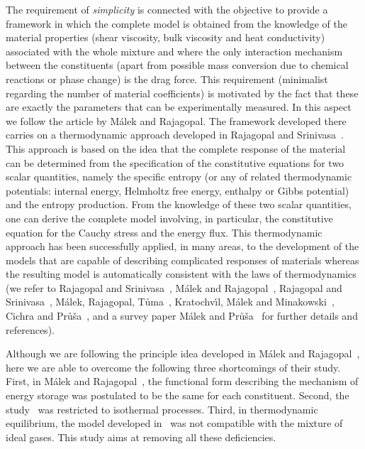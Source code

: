 \documentclass[a4paper]{article}
\begin{document}
The requirement of \textit{simplicity} is connected with the objective to provide a framework in which the complete model is obtained from the knowledge of the material properties (shear viscosity, bulk viscosity and heat conductivity) associated with the whole mixture and where the only interaction mechanism between the constituents (apart from possible mass conversion due to chemical reactions or phase change) is the drag force. This requirement (minimalist regarding the number of material coefficients) is motivated by the fact that these are exactly the parameters that can be experimentally measured. In this aspect we follow the article by M\'{a}lek and Rajagopal\cite{malek-2008}. The framework developed there carries on a thermodynamic approach developed in Rajagopal and Srinivasa~\cite{Rajagopal-Srinivasa-2004}. This approach is based on the idea that the complete response of the material can be determined from the specification of the constitutive equations for two scalar quantities, namely the specific entropy (or any of related thermodynamic potentials: internal energy, Helmholtz free energy, enthalpy or Gibbs potential) and the entropy production. From the knowledge of these two scalar quantities, one can derive the complete model involving, in particular, the constitutive equation for the Cauchy stress and the energy flux. This thermodynamic approach has been successfully applied, in many areas, to the development of the models that are capable of describing complicated responses of materials whereas the resulting model is automatically consistent with the laws of thermodynamics (we refer to Rajagopal and Srinivasa~\cite{Rajagopal-Srinivasa-2004}, M\'{a}lek and Rajagopal~\cite{malek-2008}, 
Rajagopal and Srinivasa~\cite{krrsri2011}, Málek, Rajagopal, Tůma~\cite{mkrrkt2015, mkrrkt2018}, Kratochv\'\i{}l, Málek and Minakowski~\cite{KrMaMi2016}, Cichra and Pr\r{u}\v{s}a~\cite{cipr2020},  and a survey paper M\'{a}lek and Pr\r{u}\v{s}a~\cite{Malek2016} for further details and references). 

Although we are following the principle idea developed in M\'{a}lek and Rajagopal~\cite{malek-2008}, here we are able to overcome the following three shortcomings of their study. First, in M\'{a}lek and Rajagopal~\cite{malek-2008}, the functional form describing the mechanism of energy storage was postulated to be the same for each constituent. Second, the study~\cite{malek-2008} was restricted to isothermal processes. Third, in thermodynamic equilibrium, the model developed in~ \cite{malek-2008} was not compatible with the mixture of ideal gases. This study aims at removing all these deficiencies. 
\end{document}
